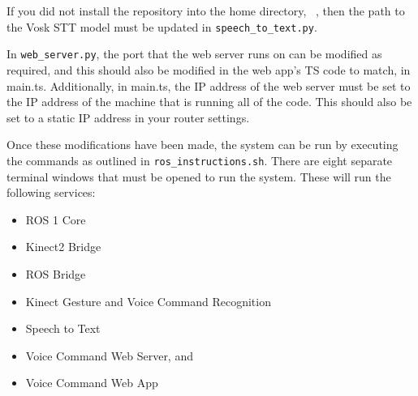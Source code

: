 If you did not install the repository into the home directory, ~, then the path to the Vosk STT model must be updated in \texttt{speech\_to\_text.py}.

In \texttt{web\_server.py}, the port that the web server runs on can be modified as required, and this should also be modified in the web app's TS code to match, in main.ts.
Additionally, in main.ts, the IP address of the web server must be set to the IP address of the machine that is running all of the code.
This should also be set to a static IP address in your router settings.

Once these modifications have been made, the system can be run by executing the commands as outlined in \texttt{ros\_instructions.sh}.
There are eight separate terminal windows that must be opened to run the system.
These will run the following services:

\begin{itemize}
    \item ROS 1 Core
    \item Kinect2 Bridge
    \item ROS Bridge
    \item Kinect Gesture and Voice Command Recognition
    \item Speech to Text
    \item Voice Command Web Server, and
    \item Voice Command Web App
\end{itemize}
